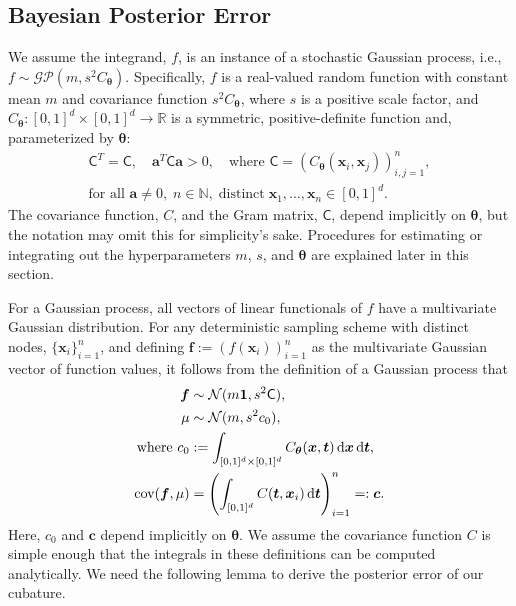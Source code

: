 \documentclass{svjour3}                     %
\newcommand{\bm}[1]{\boldsymbol{#1}}
\newcommand{\dif}[1]{\text{d}{#1}}
\newcommand{\D}[1]{\text{d}{#1}}
\newcommand{\vtheta}{{\bm{\theta}}}
\newcommand{\va}{\bm{a}}
\newcommand{\vc}{\bm{c}}
\newcommand{\vf}{\bm{f}}
\newcommand{\vt}{\bm{t}}
\newcommand{\vx}{\bm{x}}
\newcommand{\vone}{\bm{1}}
\newcommand{\mC}{\mathsf{C}}
\newcommand{\cov}{{\textup{cov}}}
\newcommand{\calN}{\mathcal{N}}
\begin{document}
\subsection{Bayesian Posterior Error}
\label{sec:BayesPostErr}

We assume the integrand, $f$, is an instance of a stochastic Gaussian process, i.e., $f \sim \mathcal{GP}(m,s^2 C_\vtheta)$.  Specifically, $f$ is a real-valued random function with constant mean $m$ and covariance function $s^2C_\vtheta$, where $s$ is a positive scale factor, and $C_\vtheta: [0,1]^d \times [0,1]^d \to \mathbb{R} $ is a symmetric, positive-definite function and, parameterized by $\vtheta$:
\begin{multline} \label{FJH:eq:CondPosDef}
\mC^T = \mC,  \quad \va^T \mC \va > 0, \quad \text{where }  \mC = \left(  C_\vtheta(\vx_i,\vx_j)  \right)_{i,j=1}^n,\\
\text{for all } \va \ne 0, \;
n\in \mathbb{N}, \; \text{distinct} \; \vx_1, \ldots, \vx_n \in [0,1]^d.
\end{multline}
The covariance function, $C$, and the Gram matrix, $\mC$, depend implicitly on $\vtheta$, but the notation may omit this for simplicity's sake.
Procedures for estimating or integrating out the hyperparameters $m$, $s$, and $\vtheta$ are explained later in this section.

For a Gaussian process, all vectors of linear functionals of $f$ have a multivariate Gaussian distribution. 
For any deterministic sampling scheme with distinct nodes, $\{\vx_i\}_{i=1}^n$, and defining  $\vf  := \left( f(\vx_i)\right)_{i=1}^n$ as the multivariate Gaussian vector of function values, it follows from the definition of a Gaussian process that 
\begin{subequations} \label{eqn:fGaussDist}
	\begin{align}
	\vf  & \sim \calN(m \vone, s^2 \mC), \\
	\mu & \sim \calN(m, s^2 c_0), 
	\\
	\text{where }
	c_0 &:= \int_{[0,1]^{d} \times [0,1]^{d}} C_\vtheta(\vx,\vt) \, \dif{\vx} \, \dif{\vt}, \\
	\cov(\vf, \mu) &= \left(  \int_{[0,1]^d} C(\vt,\vx_i) \, \D \vt \right)_{i=1}^n  =: \vc.
	\end{align}
\end{subequations}
Here, $c_0$ and $\vc$ depend implicitly on $\vtheta$.  We assume the covariance function $C$ is simple enough that the integrals in these definitions can be computed analytically.
We need the following lemma to derive the posterior error of our cubature. 
\end{document}
